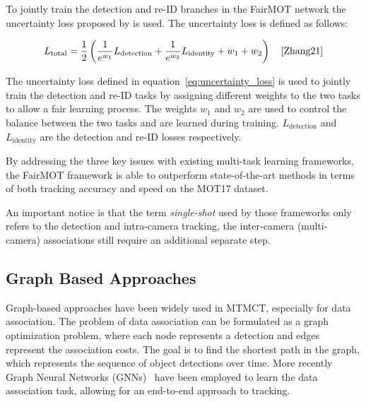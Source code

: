 To jointly train the detection and re-ID branches in the FairMOT network the uncertainty loss proposed by \textcite{Cipolla18} is used. The uncertainty loss is defined as follows:

\begin{equation}
    \label{eq:uncertainty_loss}
    L_{\text{total}}=\frac{1}{2}\left(\frac{1}{e^{w_1}} L_{\text{detection}}+\frac{1}{e^{w_2}} L_{\text{identity}}+w_1+w_2\right)
    \quad\text{\cite[Eq.~5]{Zhang21}}
\end{equation}

The uncertainty loss defined in equation~\ref{eq:uncertainty_loss} is used to jointly train the detection and re-ID tasks by assigning different weights to the two tasks to allow a fair learning process. The weights \(w_1\) and \(w_2\) are used to control the balance between the two tasks and are learned during training. \(L_{\text{detection}}\) and \(L_{\text{identity}}\) are the detection and re-ID losses respectively.

By addressing the three key issues with existing multi-task learning frameworks, the FairMOT framework is able to outperform state-of-the-art methods in terms of both tracking accuracy and speed on the MOT17 dataset.

An important notice is that the term \textit{single-shot} used by those frameworks only refers to the detection and intra-camera tracking, the inter-camera (multi-camera) associations still require an additional separate step.

\subsection{Graph Based Approaches}\label{subsec:graph_based_approaches}
Graph-based approaches have been widely used in MTMCT, especially for data association. The problem of data association can be formulated as a graph optimization problem, where each node represents a detection and edges represent the association costs. The goal is to find the shortest path in the graph, which represents the sequence of object detections over time. More recently Graph Neural Networks (GNNs)~\cite{Scarselli09} have been employed to learn the data association task, allowing for an end-to-end approach to tracking.


